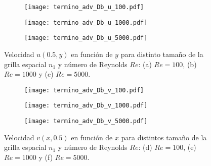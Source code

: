 \documentclass[aps,prb,twocolumn,superscriptaddress,floatfix,longbibliography,10pt]{revtex4-2}
\newcounter{para}
\begin{document}
\begin{figure}
  \centering
  \begin{subfigure}[b]{0.32\textwidth}
      \centering
      \texttt{[image: termino\_adv\_Db\_u\_100.pdf]}
      \caption{}
      \label{fig:termino_adv_Db_u_100}
  \end{subfigure}
  \hfill
  \begin{subfigure}[b]{0.32\textwidth}
      \centering
      \texttt{[image: termino\_adv\_Db\_u\_1000.pdf]}
      \caption{}
      \label{fig:termino_adv_Db_u_1000}
  \end{subfigure}
  \hfill
  \begin{subfigure}[b]{0.32\textwidth}
      \centering
      \texttt{[image: termino\_adv\_Db\_u\_5000.pdf]}
      \caption{}
      \label{fig:termino_adv_Db_u_5000}
  \end{subfigure}
     \caption{Velocidad $u(0.5,y)$ en función de $y$ para distinto tamaño de la grilla espacial $n_1$ y número de Reynolds $Re$: (a) $Re = 100$, (b) $Re = 1000$ y (c) $Re = 5000$.}
     \label{fig:velocidades_u_DC2_vs_Re}
\end{figure}

\begin{figure}
  \centering
  
  \begin{subfigure}[b]{0.32\textwidth}
    \centering
    \texttt{[image: termino\_adv\_Db\_v\_100.pdf]}
    \caption{}
    \label{fig:termino_adv_Db_v_100}
\end{subfigure}
\hfill
\begin{subfigure}[b]{0.32\textwidth}
    \centering
    \texttt{[image: termino\_adv\_Db\_v\_1000.pdf]}
    \caption{}
    \label{fig:termino_adv_Db_v_1000}
\end{subfigure}
\hfill
\begin{subfigure}[b]{0.32\textwidth}
    \centering
    \texttt{[image: termino\_adv\_Db\_v\_5000.pdf]}
    \caption{}
    \label{fig:termino_adv_Db_v_5000}
\end{subfigure}
     \caption{Velocidad $v(x,0.5)$ en función de $x$ para distintos tamaño de la grilla espacial $n_1$ y número de Reynolds $Re$: (d) $Re = 100$, (e) $Re = 1000$ y (f) $Re = 5000$.}
     \label{fig:velocidades_v_DC2_vs_Re}
\end{figure}
\end{document}
